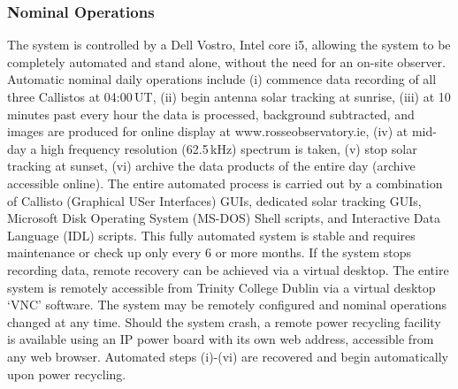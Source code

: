 \subsubsection{Nominal Operations}

The system is controlled by a Dell Vostro, Intel core i5, allowing the system to be completely automated and stand alone, without the need for an on-site observer. Automatic nominal daily operations include (i) commence data recording of all three Callistos at 04:00\,UT, (ii) begin antenna solar tracking at sunrise, (iii) at 10 minutes past every hour the data is processed, background subtracted, and images are produced for online display at www.rosseobservatory.ie, (iv) at mid-day a high frequency resolution (62.5\,kHz) spectrum is taken, (v) stop solar tracking at sunset, (vi) archive the data products of the entire day (archive accessible online). The entire automated process is carried out by a combination of Callisto (Graphical USer Interfaces) GUIs, dedicated solar tracking GUIs, Microsoft Disk Operating System (MS-DOS) Shell scripts, and Interactive Data Language (IDL) scripts. This fully automated system is stable and requires maintenance or check up only every 6 or more months. If the system stops recording data, remote recovery can be achieved via a virtual desktop. The entire system is remotely accessible from Trinity College Dublin via a virtual desktop `VNC' software. The system may be remotely configured and nominal operations changed at any time. Should the system crash, a remote power recycling facility is available using an IP power board with its own web address, accessible from any web browser. Automated steps (i)-(vi) are recovered and begin automatically upon power recycling.

